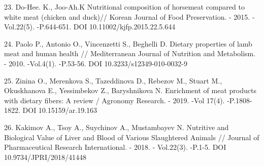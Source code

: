 \begin{references}
23. Do-Hee. K., Joo-Ah.K Nutritional composition of horsemeat compared
to white meat (chicken and duck)// Korean Journal of Food Preservation.
- 2015. -Vol.22(5). -P.644-651. DOI 10.11002/kjfp.2015.22.5.644

24. Paolo P., Antonio O., Vincenzetti S., Beghelli D. Dietary properties
of lamb meat and human health // Mediterranean Journal of Nutrition and
Metabolism. - 2010. -Vol.4(1). -P.53-56. DOI 10.3233/s12349-010-0032-9

25. Zinina O., Merenkova S., Tazeddinova D., Rebezov M., Stuart M.,
Okuskhanova E., Yessimbekov Z., Baryshnikova N. Enrichment of meat
products with dietary fibers: A review / Agronomy Research. - 2019. -Vol
17(4). -P.1808-1822. DOI 10.15159/ar.19.163

26. Kakimov A., Tsoy A., Suychinov A., Mustambayev N. Nutritive and
Biological Value of Liver and Blood of Various Slaughtered Animals //
Journal of Pharmaceutical Research International. - 2018. - Vol.22(3).
-P.1-5. DOI 10.9734/JPRI/2018/41448
\end{references}

